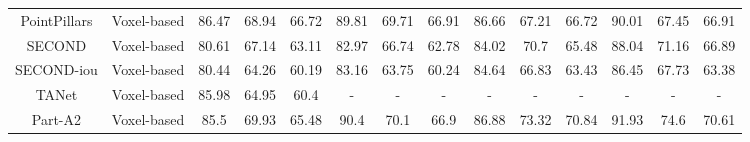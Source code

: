 \begin{table}[t]
{\begin{tabular}{c|c||ccc|ccc|ccc|ccc}
PointPillars                                                                                      & Voxel-based                                                       & 86.47                            & 68.94                            & 66.72                            & 89.81                            & 69.71                            & 66.91                            & 86.66                            & 67.21                            & 66.72                            & 90.01                            & 67.45                            & 66.91                             \\
SECOND                                                                                            & Voxel-based                                                       & 80.61                            & 67.14                            & 63.11                            & 82.97                            & 66.74                            & 62.78                            & 84.02                            & 70.7                             & 65.48                            & 88.04                            & 71.16                            & 66.89                             \\
SECOND-iou                                                                                        & Voxel-based                                                       & 80.44                            & 64.26                            & 60.19                            & 83.16                            & 63.75                            & 60.24                            & 84.64                            & 66.83                            & 63.43                            & 86.45                            & 67.73                            & 63.38                             \\
TANet                                                                                             & Voxel-based                                                       & 85.98                            & 64.95                            & 60.4                             & -                                & -                                & -                                & -                                & -                                & -                                & -                                & -                                & -                                 \\
Part-A2                                                                                           & Voxel-based                                                       & 85.5                             & 69.93                            & 65.48                            & 90.4                             & 70.1                             & 66.9                             & 86.88                            & 73.32                            & 70.84                            & 91.93                            & 74.6                             & 70.61                             \\

\end{tabular}}
\end{table}
